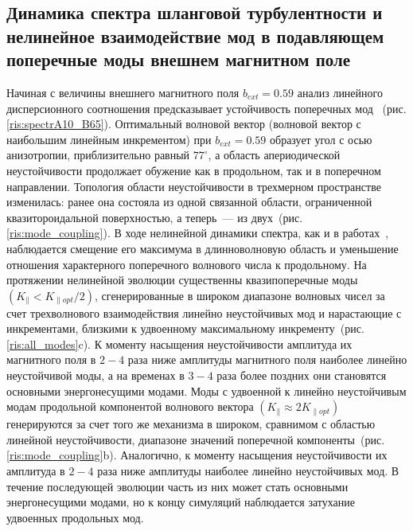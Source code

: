 \subsection{Динамика спектра шланговой турбулентности и нелинейное взаимодействие мод в подавляющем поперечные моды внешнем магнитном поле}


Начиная с величины внешнего магнитного поля $b_{ext}=0.59$ анализ линейного дисперсионного соотношения предсказывает устойчивость поперечных мод ~(рис. \ref{ris:spectrA10_B65}). Оптимальный волновой вектор (волновой вектор с наибольшим линейным инкрементом) при $b_{ext}=0.59$ образует угол с осью анизотропии, приблизительно равный $77^\circ$, а область апериодической неустойчивости продолжает обужение как в продольном, так и в поперечном направлении. Топология области неустойчивости в трехмерном пространстве изменилась: ранее она состояла из одной связанной области, ограниченной квазитороидальной поверхностью, а теперь~--- из двух~(рис. \ref{ris:mode_coupling}). В ходе нелинейной динамики спектра, как и в работах~\cite{Camporeale2008,Hellinger2014}, наблюдается смещение его максимума в длинноволновую область и уменьшение отношения характерного поперечного волнового числа к продольному. На протяжении нелинейной эволюции существенны квазипоперечные  моды  $\left(K_\|<K_{\|opt}/2\right)$, сгенерированные в широком диапазоне волновых чисел за счет трехволнового взаимодействия линейно неустойчивых мод и нарастающие с инкрементами, близкими к удвоенному максимальному инкременту~(рис. \ref{ris:all_modes}c). К моменту насыщения неустойчивости амплитуда их магнитного поля в $2-4$ раза ниже амплитуды магнитного поля наиболее линейно неустойчивой моды, а на временах в $3-4$ раза более поздних они становятся основными энергонесущими модами. Моды с удвоенной к линейно неустойчивым модам продольной компонентой волнового вектора $\left(K_\|\approx2K_{\|opt}\right)$ генерируются за счет того же механизма в широком, сравнимом с областью линейной неустойчивости, диапазоне значений поперечной компоненты~(рис. \ref{ris:mode_coupling}b). Аналогично,  к моменту насыщения неустойчивости их амплитуда в $2-4$ раза ниже амплитуды наиболее линейно неустойчивых мод. В течение последующей эволюции часть из них может стать основными энергонесущими модами, но к концу симуляций наблюдается затухание удвоенных продольных мод. 



